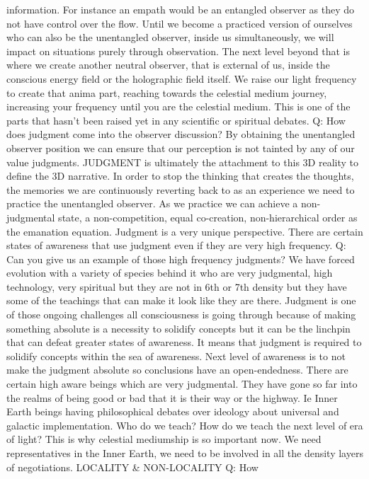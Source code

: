 information. For instance an empath would be an entangled observer as
they do not have control over the flow. Until we become a practiced
version of ourselves who can also be the unentangled observer, inside us
simultaneously, we will impact on situations purely through observation.
The next level beyond that is where we create another neutral observer,
that is external of us, inside the conscious energy field or the
holographic field itself. We raise our light frequency to create that
anima part, reaching towards the celestial medium journey, increasing
your frequency until you are the celestial medium. This is one of the
parts that hasn't been raised yet in any scientific or spiritual
debates. Q: How does judgment come into the observer discussion? By
obtaining the unentangled observer position we can ensure that our
perception is not tainted by any of our value judgments. JUDGMENT is
ultimately the attachment to this 3D reality to define the 3D narrative.
In order to stop the thinking that creates the thoughts, the memories we
are continuously reverting back to as an experience we need to practice
the unentangled observer. As we practice we can achieve a non-judgmental
state, a non-competition, equal co-creation, non-hierarchical order as
the emanation equation. Judgment is a very unique perspective. There are
certain states of awareness that use judgment even if they are very high
frequency. Q: Can you give us an example of those high frequency
judgments? We have forced evolution with a variety of species behind it
who are very judgmental, high technology, very spiritual but they are
not in 6th or 7th density but they have some of the teachings that can
make it look like they are there. Judgment is one of those ongoing
challenges all consciousness is going through because of making
something absolute is a necessity to solidify concepts but it can be the
linchpin that can defeat greater states of awareness. It means that
judgment is required to solidify concepts within the sea of awareness.
Next level of awareness is to not make the judgment absolute so
conclusions have an open-endedness. There are certain high aware beings
which are very judgmental. They have gone so far into the realms of
being good or bad that it is their way or the highway. Ie Inner Earth
beings having philosophical debates over ideology about universal and
galactic implementation. Who do we teach? How do we teach the next level
of era of light? This is why celestial mediumship is so important now.
We need representatives in the Inner Earth, we need to be involved in
all the density layers of negotiations. LOCALITY \& NON-LOCALITY Q: How
